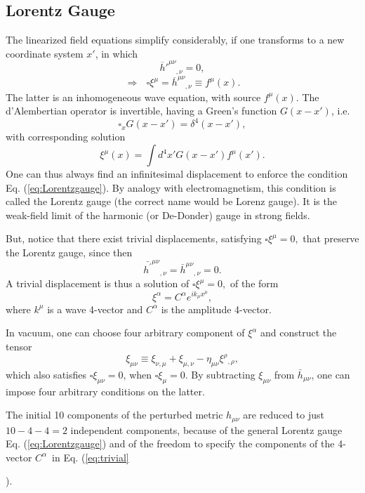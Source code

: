 \documentclass[12pt]{article}
\begin{document}
{\subsection{Lorentz Gauge}
The linearized field equations simplify considerably, if one transforms to a new coordinate system $x'$, in which \begin{equation}
{\overline h'}^{\mu\nu}_{\phantom{\mu\nu},\nu}=0,
\label{eq:Lorentzgauge}
\end{equation}
\begin{equation}
\Rightarrow \ \ \ \square \xi^{\mu}={\overline
h}^{\mu\nu}_{\phantom{\mu\nu},\nu} \equiv f^{\mu}(x).
\end{equation}
The latter is an inhomogeneous wave equation, with source $f^\mu(x)$. The d'Alembertian operator is invertible, having a Green's function $G(x-x')$, i.e.
\begin{equation}
\square_{x} G(x-x')=\delta^{4}(x-x'),
\end{equation}
with corresponding solution 
\begin{equation}
\xi^{\mu}(x)=\int d^{4} x 'G(x-x') f^{\mu}(x').
\end{equation}
One can thus always find an infinitesimal displacement to enforce the condition Eq. (\ref{eq:Lorentzgauge}). By analogy with electromagnetism, this condition is called the  Lorentz gauge (the correct name would be Lorenz gauge). It is the weak-field limit of the harmonic (or De-Donder) gauge in strong fields. 

But, notice that there exist trivial displacements, satisfying $\square \xi^{\mu}=0,$ that preserve the Lorentz gauge, since then
\begin{equation}
\bar{h^{\prime}}^{\mu \nu}{}_{,\nu}=\bar{h}^{\mu \nu}{}_{,\nu}=0.
\end{equation}
 A trivial displacement is thus a solution of $\square \xi^{\mu}=0,$ of the form
\begin{equation}
\xi^{\alpha}=C^{\alpha}e^{ik_{\mu}x^{\mu}},
\label{eq:trivial}
\end{equation}
where $k^\mu$ is a wave 4-vector and $C^\alpha$ is the amplitude 4-vector.

In vacuum, one can choose four arbitrary component of $\xi^\alpha$ and construct the tensor
\begin{equation}
\xi_{\mu \nu} \equiv  \xi_{\nu, \mu}+ \xi_{\mu, \nu}-\eta_{\mu \nu} \xi^{\rho}{}_{,\rho},
\end{equation}
which also satisfies $ \square \xi_{\mu \nu}=0 $, when $ \square \xi_{\mu }=0 $. By subtracting  $\xi_{\mu \nu}$  from $\bar h_{\mu\nu}$, one can impose four arbitrary conditions on the latter.

The initial 10 components of the perturbed metric $h_{\mu\nu}$ are reduced to just $10-4-4=2$ independent components, because of the general Lorentz gauge Eq. (\ref{eq:Lorentzgauge}) and of the freedom to specify the components of the 4-vector $C^\alpha$\ in Eq. (\ref{eq:trivial}}).
\end{document}
